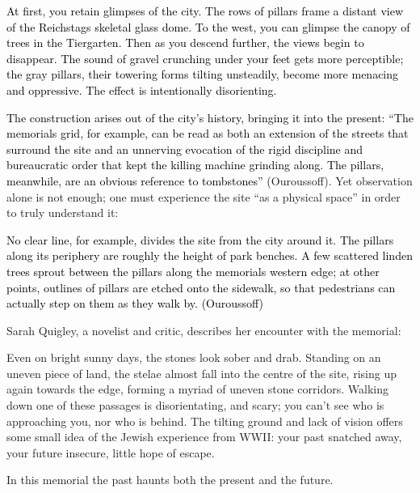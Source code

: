\textcolor{black}{At first, you retain glimpses of the city.  The rows
of pillars frame a distant view of the Reichstag{\textquotesingle}s
skeletal glass dome.  To the west, you can glimpse the canopy of trees
in the Tiergarten.  Then as you descend further, the views begin to
disappear.  The sound of gravel crunching under your feet gets more
perceptible; the gray pillars, their towering forms tilting unsteadily,
become more menacing and oppressive.  The effect is intentionally
disorienting.  }

\textcolor{black}{The construction arises out of the city’s history,
bringing it into the present: “The memorial{\textquotesingle}s grid,
for example, can be read as both an extension of the streets that
surround the site and an unnerving evocation of the rigid discipline
and bureaucratic order that kept the killing machine grinding along. 
The pillars, meanwhile, are an obvious reference to tombstones”
(}Ouroussoff).  Yet observation alone is not enough; one must
experience the site “as a physical space” in order to truly understand
it: 

\textcolor{black}{No clear line, for example, divides the site from the
city around it.  The pillars along its periphery are roughly the height
of park benches.  A few scattered linden trees sprout between the
pillars along the memorial{\textquotesingle}s western edge; at other
points, outlines of pillars are etched onto the sidewalk, so that
pedestrians can actually step on them as they walk by.  (Ouroussoff)}

{\color{black}
Sarah Quigley, a novelist and critic, describes her encounter with the
memorial: }

{\color{black}
\textcolor[rgb]{0.0,0.0,0.039215688}{Even on bright sunny days, the
stones look sober and drab.  }Standing on an uneven piece of land, the
stelae almost fall into the centre of the site, rising up again towards
the edge, forming a myriad of uneven stone corridors.  Walking down one
of these passages is disorientating, and scary; you can’t see who is
approaching you, nor who is behind.  The tilting ground and lack of
vision offers some small idea of the Jewish experience from WWII: your
past snatched away, your future insecure, little hope of escape.  }

{\color{black}
\textcolor[rgb]{0.0,0.0,0.039215688}{In this memorial the past haunts
both the present and the future.}}

